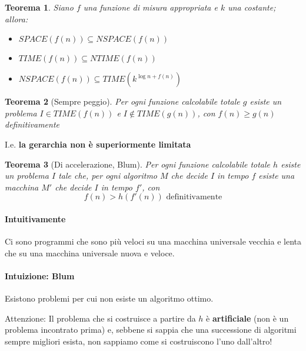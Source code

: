 \documentclass[a4paper,10pt,oneside]{article}
\theoremstyle{break}
\newtheorem{teo}{Teorema}[subsection]
\begin{document}
\begin{mdframed}
 \begin{teo}
  Siano $f$ una funzione di misura appropriata e $k$ una costante; allora:

  \begin{itemize}
   \item $SPACE (f(n)) \subseteq NSPACE(f(n))$
   \item $TIME (f(n)) \subseteq NTIME(f(n))$
   \item $NSPACE (f(n)) \subseteq TIME (k^{\log n + f(n)})$
  \end{itemize}

 \end{teo}

\end{mdframed}

\begin{mdframed}
 \begin{teo} [Sempre peggio]
  Per ogni funzione calcolabile totale $g$ esiste un problema $I \in TIME(f(n))$ e $I \notin TIME(g(n))$, con $f(n) \geq g(n)$ definitivamente
 \end{teo}

 \dotfill

 I.e. \textbf{la gerarchia non è superiormente limitata}
 \end{mdframed}


 \begin{mdframed}
  \begin{teo} [Di accelerazione, Blum]
    Per ogni funzione calcolabile totale $h$ esiste un problema $I$ tale che, per ogni algoritmo $M$ che decide $I$ in tempo $f$ esiste una macchina $M'$ che decide $I$ in tempo $f'$, con
    \[ f(n) > h(f'(n)) \text{ definitivamente}\]
  \end{teo}

  \dotfill

  \paragraph{Intuitivamente} Ci sono programmi che sono più veloci su una macchina universale vecchia e lenta che su una macchina universale nuova e veloce.

  \paragraph{Intuizione: Blum} Esistono problemi per cui non esiste un algoritmo ottimo.

  \dotfill

  Attenzione: Il problema che si costruisce a partire da $h$ è \textbf{artificiale} (non è un problema incontrato prima) e, sebbene si sappia che una successione di algoritmi sempre migliori esista, non sappiamo come si costruiscono l'uno dall'altro!


 \end{mdframed}
\end{document}
